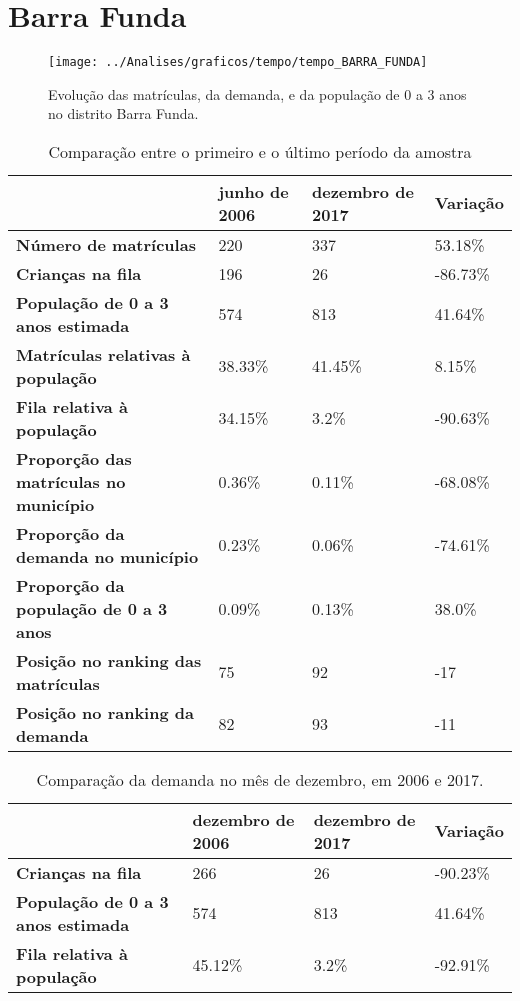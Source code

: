\section{Barra Funda}
\begin{figure}[H]
\centering
\texttt{[image: ../Analises/graficos/tempo/tempo\_BARRA\_FUNDA]}
\caption{Evolução das matrículas, da demanda, e da população de 0 a 3 anos no distrito Barra Funda.}
\end{figure}
\begin{table}[H]
\begin{tabular}{|l|l|l|l|}
\hline
\textbf{}                                      & \textbf{junho de 2006}       & \textbf{dezembro de 2017}    & \textbf{Variação} \\ \hline
\textbf{Número de matrículas}                  & 220 & 337 & 53.18\% \\ \hline
\textbf{Crianças na fila}                      & 196 & 26 & -86.73\% \\ \hline
\textbf{População de 0 a 3 anos estimada}      & 574 & 813 & 41.64\% \\ \hline
\textbf{Matrículas relativas à população}      & 38.33\% & 41.45\% & 8.15\% \\ \hline
\textbf{Fila relativa à população}             & 34.15\% & 3.2\% & -90.63\% \\ \hline
\textbf{Proporção das matrículas no município} & 0.36\% & 0.11\% & -68.08\% \\ \hline
\textbf{Proporção da demanda no município}     & 0.23\% & 0.06\% & -74.61\% \\ \hline
\textbf{Proporção da população de 0 a 3 anos}  & 0.09\% & 0.13\% & 38.0\% \\ \hline
\textbf{Posição no ranking das matrículas}     & 75 & 92 & -17 \\ \hline
\textbf{Posição no ranking da demanda}         & 82 & 93 & -11 \\ \hline
\end{tabular}
\caption{Comparação entre o primeiro e o último período da amostra}
\end{table}
\begin{table}[H]
\begin{tabular}{|l|l|l|l|}
\hline
\textbf{}                                 & \textbf{dezembro de 2006} & \textbf{dezembro de 2017} & \textbf{Variação} \\ \hline
\textbf{Crianças na fila}                      & 266 & 26 & -90.23\% \\ \hline
\textbf{População de 0 a 3 anos estimada}      & 574 & 813 & 41.64\% \\ \hline
\textbf{Fila relativa à população}             & 45.12\% & 3.2\% & -92.91\% \\ \hline
\end{tabular}
\caption{Comparação da demanda no mês de dezembro, em 2006 e 2017.}
\end{table}
